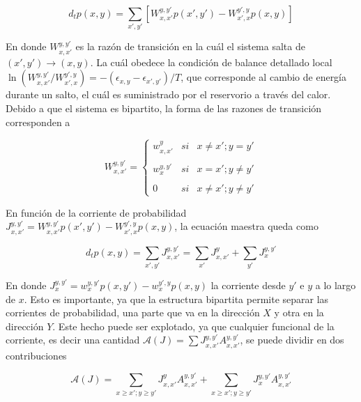 \begin{equation*}
    d_{t}p(x,y) = \sum_{x',y'} \left[ W_{x,x'}^{y,y'}p(x',y')  - W_{x',x}^{y',y}p(x,y) \right]
\end{equation*}

En donde $W_{x,x'}^{y,y'}$ es la razón de transición en la cuál el sistema salta de $(x',y') \to (x,y)$. La cuál obedece la condición de balance detallado local $\ln (W_{x,x'}^{y,y'}/W_{x',x}^{y',y}) = - (\epsilon_{x,y} - \epsilon_{x',y'})/T$, que corresponde al cambio de energía durante un salto, el cuál es suministrado por el reservorio a través del calor. Debido a que el sistema es bipartito, la forma de las razones de transición corresponden a

\begin{equation*}
    W_{x,x'}^{y,y'} = \left\{ \begin{array}{lcc} w_{x,x'}^{y} & si & x \neq x'; y=y' \\ \\ w_{x}^{y,y'} & si & x=x';y\neq y'\\ \\ 0 & si & x \neq x'; y \neq y' \end{array} \right.
\end{equation*}

En función de la corriente de probabilidad $J_{x,x'}^{y,y'} = W_{x,x'}^{y,y'}p(x',y') - W_{x',x}^{y',y}p(x,y)$, la ecuación maestra queda como 

\begin{equation*}
    d_{t}p(x,y) = \sum_{x',y'}J_{x,x'}^{y,y'} = \sum_{x'}J_{x,x'}^{y} + \sum_{y'}J_{x}^{y,y'}
\end{equation*}

En donde $J_{x}^{y,y'} = w_{x}^{y,y'}p(x,y') - w_{x}^{y',y}p(x,y)$ la corriente desde $y'$ e $y$ a lo largo de $x$. Esto es importante, ya que la estructura bipartita permite separar las corrientes de probabilidad, una parte que va en la dirección $X$ y otra en la dirección $Y$. Este hecho puede ser explotado, ya que cualquier funcional de la corriente, es decir una cantidad $\mathcal{A}(J) = \sum J_{x,x'}^{y,y'}A_{x,x'}^{y,y'}$, se puede dividir en dos contribuciones\cite{horowitz2014thermodynamics}

\begin{equation}
    \mathcal{A}(J) = \sum_{x\geq x';y \geq y'} J_{x,x'}^{y}A_{x,x'}^{y,y'} + \sum_{x \geq x'; y \geq y'}J_{x}^{y,y'} A_{x,x'}^{y,y'}
\label{sec4:functionalcurrent}
\end{equation}

